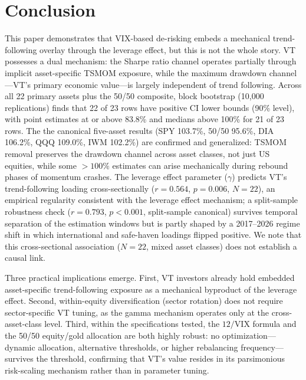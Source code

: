 \section{Conclusion}

This paper demonstrates that VIX-based de-risking embeds a mechanical trend-following overlay through the leverage effect, but this is not the whole story. VT possesses a dual mechanism: the Sharpe ratio channel operates partially through implicit asset-specific TSMOM exposure, while the maximum drawdown channel---VT's primary economic value---is largely independent of trend following. Across all 22 primary assets plus the 50/50 composite, block bootstrap (10,000 replications) finds that 22 of 23 rows have positive CI lower bounds (90\% level), with point estimates at or above 83.8\% and medians above 100\% for 21 of 23 rows. The the canonical five-asset results (SPY 103.7\%, 50/50 95.6\%, DIA 106.2\%, QQQ 109.0\%, IWM 102.2\%) are confirmed and generalized: TSMOM removal preserves the drawdown channel across asset classes, not just US equities, while some $>100\%$ estimates can arise mechanically during rebound phases of momentum crashes. The leverage effect parameter ($\gamma$) predicts VT's trend-following loading cross-sectionally ($r = 0.564$, $p = 0.006$, $N = 22$), an empirical regularity consistent with the leverage effect mechanism; a split-sample robustness check ($r = 0.793$, $p < 0.001$, split-sample canonical) survives temporal separation of the estimation windows but is partly shaped by a 2017--2026 regime shift in which international and safe-haven loadings flipped positive. We note that this cross-sectional association ($N = 22$, mixed asset classes) does not establish a causal link.

Three practical implications emerge. First, VT investors already hold embedded asset-specific trend-following exposure as a mechanical byproduct of the leverage effect. Second, within-equity diversification (sector rotation) does not require sector-specific VT tuning, as the gamma mechanism operates only at the cross-asset-class level. Third, within the specifications tested, the $12/\text{VIX}$ formula and the 50/50 equity/gold allocation are both highly robust: no optimization---dynamic allocation, alternative thresholds, or higher rebalancing frequency---survives the \citet{harvey2016} threshold, confirming that VT's value resides in its parsimonious risk-scaling mechanism rather than in parameter tuning.

